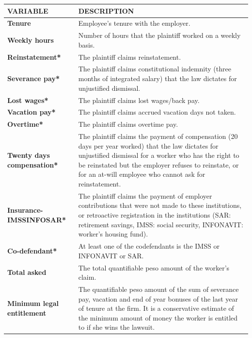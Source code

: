 \begin{tabular}{p{2.25cm}| p{12cm}}
\toprule
\rowcolor[rgb]{ .267,  .329,  .416} \textcolor[rgb]{ 1,  1,  1}{\textbf{VARIABLE}} & \textcolor[rgb]{ 1,  1,  1}{\textbf{DESCRIPTION}} \\
\midrule
\textbf{Tenure} & Employee's tenure with the employer. \\
\midrule
\textbf{Weekly hours} & Number of hours that the plaintiff worked on a weekly basis. \\
\midrule
\textbf{Reinstatement*} & The plaintiff claims reinstatement. \\
\midrule
\textbf{Severance pay*} & The plaintiff claims constitutional indemnity (three months of integrated salary) that the law dictates for unjustified dismissal. \\
\midrule
\textbf{Lost wages*} & The plaintiff claims lost wages/back pay. \\
\midrule
\textbf{Vacation pay*} & The plaintiff claims accrued vacation days not taken. \\
\midrule
\textbf{Overtime*} & The plaintiff claims overtime pay. \\
\midrule
\textbf{Twenty days compensation*} & The plaintiff claims the payment of compensation (20 days per year worked) that the law dictates for unjustified dismissal for a worker who has the right to be reinstated but the employer refuses to reinstate, or for an at-will employee who cannot ask for reinstatement. \\
\midrule
\textbf{Insurance- IMSSINFOSAR*} & The plaintiff claims the payment of employer contributions that were not made to these institutions, or retroactive registration in the institutions (SAR: retirement savings, IMSS: social security, INFONAVIT: worker's housing fund). \\
\midrule
\textbf{Co-defendant*} & At least one of the codefendants is the IMSS or INFONAVIT or SAR. \\
\midrule
\textbf{Total asked} & The total quantifiable peso amount of the worker's claim. \\
\midrule
\textbf{Minimum legal entitlement} & The quantifiable peso amount of the sum of severance pay, vacation and end of year bonuses of the last year of tenure at the firm. It is a conservative estimate of the minimum amount of money the worker is entitled to if she wins the lawsuit. \\
\bottomrule
\end{tabular}%
